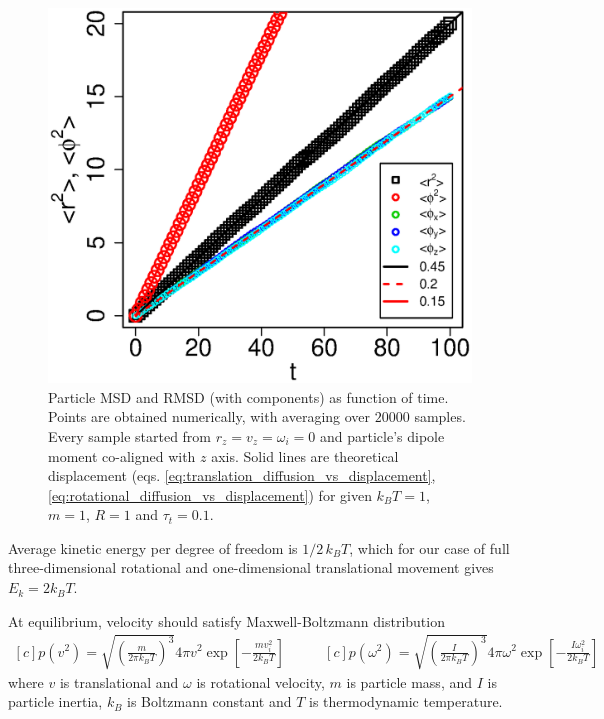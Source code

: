\begin{figure}[h]
\centering
	\includegraphics[height=0.3\textheight]{Images/DiffusionStats_drift}
	\captionsetup{justification=centering, width=0.9\textwidth}
	\caption{Particle MSD and RMSD (with components) as function of time. Points are obtained numerically, with averaging over $20000$ samples. Every sample started from $r_z = v_z = \omega_i = 0$ and particle's  dipole moment co-aligned with $z$ axis. Solid lines are theoretical displacement (eqs. \eqref{eq:translation_diffusion_vs_displacement}, \eqref{eq:rotational_diffusion_vs_displacement}) for given $k_BT = 1$, $m = 1$, $R = 1$ and $\tau_t = 0.1$.}
	\label{fig:diffusion_stats_mean_square_displacement}
\end{figure}

Average kinetic energy per degree of freedom is $1/2 \, k_B T$, which for our case of full three-dimensional rotational and one-dimensional translational movement gives $E_k = 2 k_B T$.

At equilibrium, velocity should satisfy Maxwell-Boltzmann distribution
\begin{equation}
\label{eq:maxwell_boltzmann_velocity}
	\begin{aligned}[c]
		p(v^2)
			= \sqrt{ \left(\frac{m}{2 \pi k_B T}\right)^3}
			4 \pi v^2 \exp \left[-\frac{mv_i^2}{2k_BT}\right]
	\end{aligned}
	\qquad
	\begin{aligned}[c]
		p(\omega^2)
			= \sqrt{ \left(\frac{I}{2 \pi k_B T}\right)^3}
			4 \pi \omega^2 \exp\left[-\frac{I\omega_i^2}{2 k_B T}\right]
	\end{aligned}
\end{equation}
where $v$ is translational and $\omega$ is rotational velocity, $m$ is particle mass, and $I$ is particle inertia, $k_B$ is Boltzmann constant and $T$ is thermodynamic temperature.

